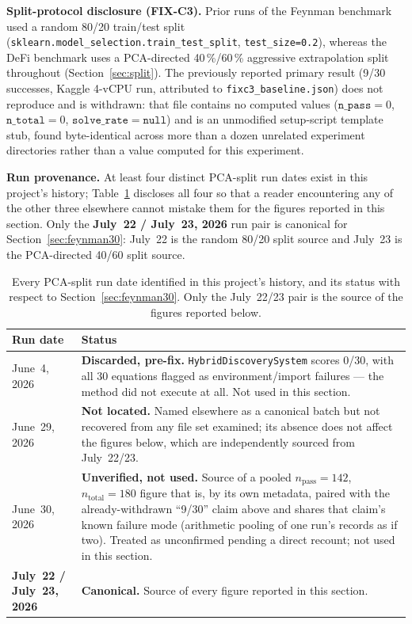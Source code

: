 \documentclass[twoside,11pt]{article}
\begin{document}
\textbf{Split-protocol disclosure (FIX-C3).}\quad
Prior runs of the Feynman benchmark used a random 80/20 train/test split
(\texttt{sklearn.model\_selection.train\_test\_split}, \texttt{test\_size=0.2}),
whereas the DeFi benchmark uses a PCA-directed 40\,\%/60\,\% aggressive
extrapolation split throughout (Section~\ref{sec:split}).
The previously reported primary result (9/30 successes, Kaggle 4-vCPU run,
attributed to \texttt{fixc3\_baseline.json}) does not reproduce and is
withdrawn: that file contains no computed values
($\mathtt{n\_pass}{=}0$, $\mathtt{n\_total}{=}0$, $\mathtt{solve\_rate}{=}\mathtt{null}$)
and is an unmodified setup-script template stub, found byte-identical across
more than a dozen unrelated experiment directories rather than a value
computed for this experiment.

\textbf{Run provenance.}\quad
At least four distinct PCA-split run dates exist in this project's history;
Table~\ref{tab:provenance} discloses all four so that a reader encountering
any of the other three elsewhere cannot mistake them for the figures reported
in this section. Only the \textbf{July~22 / July~23, 2026} run pair is
canonical for Section~\ref{sec:feynman30}: July~22 is the random 80/20 split
source and July~23 is the PCA-directed 40/60 split source.

\begin{table}[h]
\centering
\caption{Every PCA-split run date identified in this project's history, and
  its status with respect to Section~\ref{sec:feynman30}. Only the
  July~22/23 pair is the source of the figures reported below.}
\label{tab:provenance}
\small
\begin{tabular}{lp{9.3cm}}
\toprule
Run date & Status \\
\midrule
June~4, 2026 & \textbf{Discarded, pre-fix.} \texttt{HybridDiscoverySystem}
scores 0/30, with all 30 equations flagged as environment/import failures
--- the method did not execute at all. Not used in this section. \\
June~29, 2026 & \textbf{Not located.} Named elsewhere as a canonical batch
but not recovered from any file set examined; its absence does not affect
the figures below, which are independently sourced from July~22/23. \\
June~30, 2026 & \textbf{Unverified, not used.} Source of a pooled
$n_{\text{pass}}{=}142$, $n_{\text{total}}{=}180$ figure that is, by its own
metadata, paired with the already-withdrawn ``9/30'' claim above and shares
that claim's known failure mode (arithmetic pooling of one run's records as
if two). Treated as unconfirmed pending a direct recount; not used in this
section. \\
\textbf{July~22 / July~23, 2026} & \textbf{Canonical.} Source of every
figure reported in this section. \\
\bottomrule
\end{tabular}
\end{table}
\end{document}
